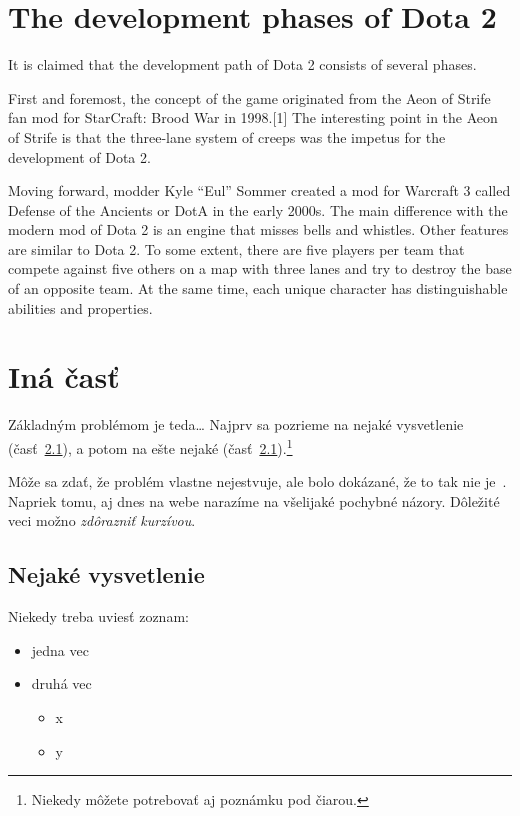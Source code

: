 \documentclass[10pt,twoside,slovak,a4paper]{article}
\begin{document}
\section{The development phases of Dota 2} \label{The development phases of Dota 2}
It is claimed that the development path of Dota 2 consists of several phases.

First and foremost, the concept of the game originated from the Aeon of Strife fan mod for StarCraft: Brood War in 1998.[1] The interesting point in the Aeon of Strife is that the three-lane system of creeps was the impetus for the development of Dota 2. 

Moving forward, modder Kyle “Eul” Sommer created a mod for Warcraft 3 called Defense of the Ancients or DotA in the early 2000s. The main difference with the modern mod of Dota 2 is an engine that misses bells and whistles. Other features are similar to Dota 2. To some extent, there are five players per team that compete against five others on a map with three lanes and try to destroy the base of an opposite team. At the same time, each unique character has distinguishable abilities and properties. 




\section{Iná časť} \label{ina}

Základným problémom je teda\ldots{} Najprv sa pozrieme na nejaké vysvetlenie (časť~\ref{ina:nejake}), a potom na ešte nejaké (časť~\ref{ina:nejake}).\footnote{Niekedy môžete potrebovať aj poznámku pod čiarou.}

Môže sa zdať, že problém vlastne nejestvuje\cite{Coplien:MPD}, ale bolo dokázané, že to tak nie je~\cite{Czarnecki:Staged, Czarnecki:Progress}. Napriek tomu, aj dnes na webe narazíme na všelijaké pochybné názory\cite{PLP-Framework}. Dôležité veci možno \emph{zdôrazniť kurzívou}.


\subsection{Nejaké vysvetlenie} \label{ina:nejake}

Niekedy treba uviesť zoznam:

\begin{itemize}
\item jedna vec
\item druhá vec
	\begin{itemize}
	\item x
	\item y
	\end{itemize}
\end{itemize}
\end{document}
